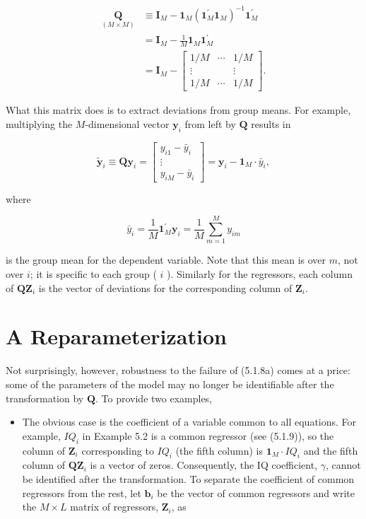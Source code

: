 \documentclass[10pt]{article}
\begin{document}
\begin{align*}
\underset{(M \times M)}{\mathbf{Q}} & \equiv \mathbf{I}_{M}-\mathbf{1}_{M}\left(\mathbf{1}_{M}^{\prime} \mathbf{1}_{M}\right)^{-1} \mathbf{1}_{M}^{\prime} \\
& =\mathbf{I}_{M}-\frac{1}{M} \mathbf{1}_{M} \mathbf{1}_{M}^{\prime} \\
& =\mathbf{I}_{M}-\left[\begin{array}{ccc}
1 / M & \cdots & 1 / M \\
\vdots & & \vdots \\
1 / M & \cdots & 1 / M
\end{array}\right] . \tag{5.1.10}
\end{align*}


What this matrix does is to extract deviations from group means. For example, multiplying the $M$-dimensional vector $\mathbf{y}_{i}$ from left by $\mathbf{Q}$ results in

\[
\tilde{\mathbf{y}}_{i} \equiv \mathbf{Q} \mathbf{y}_{i}=\left[\begin{array}{c}
y_{i 1}-\bar{y}_{i}  \tag{5.1.11}\\
\vdots \\
y_{i M}-\bar{y}_{i}
\end{array}\right]=\mathbf{y}_{i}-\mathbf{1}_{M} \cdot \bar{y}_{i},
\]

where

$$
\bar{y}_{i}=\frac{1}{M} \mathbf{1}_{M}^{\prime} \mathbf{y}_{i}=\frac{1}{M} \sum_{m=1}^{M} y_{i m}
$$

is the group mean for the dependent variable. Note that this mean is over $m$, not over $i$; it is specific to each group ( $i$ ). Similarly for the regressors, each column of $\mathbf{Q} \mathbf{Z}_{i}$ is the vector of deviations for the corresponding column of $\mathbf{Z}_{i}$.

\section*{A Reparameterization}
Not surprisingly, however, robustness to the failure of (5.1.8a) comes at a price: some of the parameters of the model may no longer be identifiable after the transformation by $\mathbf{Q}$. To provide two examples,

\begin{itemize}
  \item The obvious case is the coefficient of a variable common to all equations. For example, $I Q_{i}$ in Example 5.2 is a common regressor (see (5.1.9)), so the column of $\mathbf{Z}_{i}$ corresponding to $I Q_{i}$ (the fifth column) is $\mathbf{1}_{M} \cdot I Q_{i}$ and the fifth column of $\mathbf{Q} \mathbf{Z}_{i}$ is a vector of zeros. Consequently, the IQ coefficient, $\gamma$, cannot\\
be identified after the transformation. To separate the coefficient of common regressors from the rest, let $\mathbf{b}_{i}$ be the vector of common regressors and write the $M \times L$ matrix of regressors, $\mathbf{Z}_{i}$, as
\end{itemize}
\end{document}
